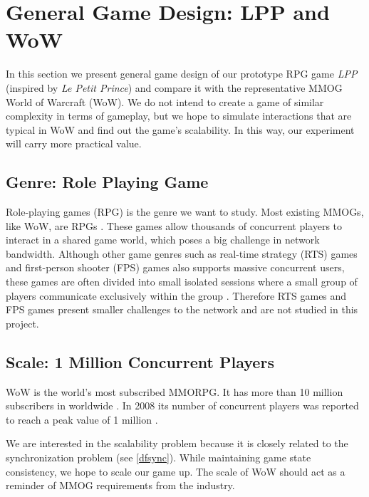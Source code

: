 \documentclass{article}
\begin{document}
\section{General Game Design: LPP and WoW}
\label{ggd}
In this section we present general game design of our prototype RPG game \emph{LPP} (inspired by \emph{Le Petit Prince}) and compare it with the representative MMOG World of Warcraft (WoW). We do not intend to create a game of similar complexity in terms of gameplay, but we hope to simulate interactions that are typical in WoW and find out the game's scalability. In this way, our experiment will carry more practical value.

\subsection{Genre: Role Playing Game}
Role-playing games (RPG) is the genre we want to study. Most existing MMOGs, like WoW, are RPGs \cite{Knutsson04}. These games allow thousands of concurrent players to interact in a shared game world, which poses a big challenge in network bandwidth. Although other game genres such as real-time strategy (RTS) games and first-person shooter (FPS) games also supports massive concurrent users, these games are often divided into small isolated sessions where a small group of players communicate exclusively within the group \cite{Knutsson04}. Therefore RTS games and FPS games present smaller challenges to the network and are not studied in this project.

\subsection{Scale: 1 Million Concurrent Players}
WoW is the world's most subscribed MMORPG. It has more than 10 million subscribers in worldwide \cite{wow12, Schiano11}. In 2008 its number of concurrent players was reported to reach a peak value of 1 million \cite{wow08}. 

We are interested in the scalability problem because it is closely related to the synchronization problem (see \ref{dfsync}). While maintaining game state consistency, we hope to scale our game up. The scale of WoW should act as a reminder of MMOG requirements from the industry.
\end{document}

